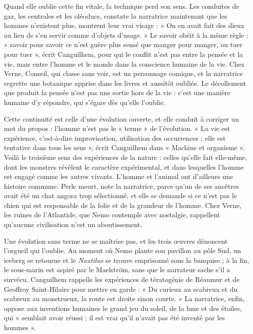 \documentclass[11pt,a4paper]{article}
\begin{document}
Quand elle oublie cette fin vitale, la technique perd son sens. Les conduites de gaz, les centrales et les oléoducs, constate la narratrice maintenant que les hommes n'existent plus, montrent leur vrai visage : « On en avait fait des dieux au lieu de s'en servir comme d'objets d'usage. » Le savoir obéit à la même règle : « savoir pour savoir ce n'est guère plus sensé que manger pour manger, ou tuer pour tuer », écrit Canguilhem, pour qui le conflit n'est pas entre la pensée et la vie, mais entre l'homme et le monde dans la conscience humaine de la vie. Chez Verne, Conseil, qui classe sans voir, est un personnage comique, et la narratrice regrette une botanique apprise dans les livres et aussitôt oubliée. Le décollement que produit la pensée n'est pas une sortie hors de la vie : c'est une manière humaine d'y répondre, qui s'égare dès qu'elle l'oublie.

Cette continuité est celle d'une évolution ouverte, et elle conduit à corriger un mot du propos : l'homme n'est pas le « terme » de l'évolution. « La vie est expérience, c'est-à-dire improvisation, utilisation des occurrences ; elle est tentative dans tous les sens », écrit Canguilhem dans « Machine et organisme ». Voilà le troisième sens des expériences de la nature : celles qu'elle fait elle-même, dont les monstres révèlent le caractère expérimental, et dans lesquelles l'homme est engagé comme les autres vivants. L'homme et l'animal ont d'ailleurs une histoire commune. Perle meurt, note la narratrice, parce qu'un de ses ancêtres avait été un chat angora trop sélectionné, et elle se demande si ce n'est pas le chien qui est responsable de la folie et de la grandeur de l'homme. Chez Verne, les ruines de l'Atlantide, que Nemo contemple avec nostalgie, rappellent qu'aucune civilisation n'est un aboutissement.

Une évolution sans terme ne se maîtrise pas, et les trois œuvres dénoncent l'orgueil qui l'oublie. Au moment où Nemo plante son pavillon au pôle Sud, un iceberg se retourne et le \emph{Nautilus} se trouve emprisonné sous la banquise ; à la fin, le sous-marin est aspiré par le Maelström, sans que le narrateur sache s'il a survécu. Canguilhem rappelle les expériences de tératogénie de Réaumur et de Geoffroy Saint-Hilaire pour mettre en garde : « Du curieux au scabreux et du scabreux au monstrueux, la route est droite sinon courte. » La narratrice, enfin, oppose aux inventions humaines le grand jeu du soleil, de la lune et des étoiles, qui « semblait avoir réussi ; il est vrai qu'il n'avait pas été inventé par les hommes ».
\end{document}
